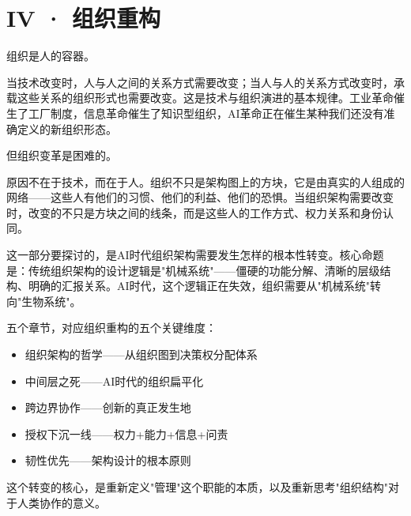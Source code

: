 \part{IV · 组织重构}



组织是人的容器。

当技术改变时，人与人之间的关系方式需要改变；当人与人的关系方式改变时，承载这些关系的组织形式也需要改变。这是技术与组织演进的基本规律。工业革命催生了工厂制度，信息革命催生了知识型组织，AI革命正在催生某种我们还没有准确定义的新组织形态。

但组织变革是困难的。

原因不在于技术，而在于人。组织不只是架构图上的方块，它是由真实的人组成的网络——这些人有他们的习惯、他们的利益、他们的恐惧。当组织架构需要改变时，改变的不只是方块之间的线条，而是这些人的工作方式、权力关系和身份认同。

这一部分要探讨的，是AI时代组织架构需要发生怎样的根本性转变。核心命题是：传统组织架构的设计逻辑是"机械系统"——僵硬的功能分解、清晰的层级结构、明确的汇报关系。AI时代，这个逻辑正在失效，组织需要从"机械系统"转向"生物系统"。

五个章节，对应组织重构的五个关键维度：
\begin{itemize}
\item 组织架构的哲学——从组织图到决策权分配体系
\item 中间层之死——AI时代的组织扁平化
\item 跨边界协作——创新的真正发生地
\item 授权下沉一线——权力+能力+信息+问责
\item 韧性优先——架构设计的根本原则

\end{itemize}
这个转变的核心，是重新定义"管理"这个职能的本质，以及重新思考"组织结构"对于人类协作的意义。

